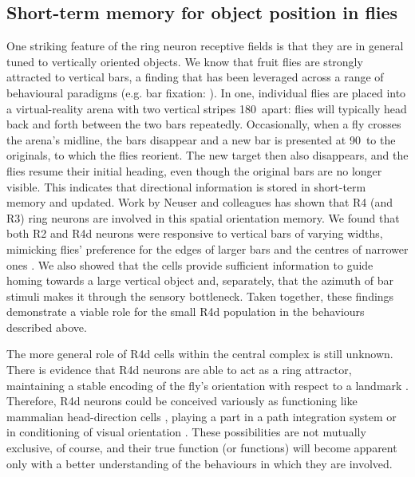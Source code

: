 \subsection*{Short-term memory for object position in flies}
One striking feature of the ring neuron receptive fields is that they are in general tuned to vertically oriented objects. We know that fruit flies are strongly attracted to vertical bars, a finding that has been leveraged across a range of behavioural paradigms (e.g. bar fixation: \cite{Neuser2008}). In one, individual flies are placed into a virtual-reality arena with two vertical stripes 180\degree\ apart: flies will typically head back and forth between the two bars repeatedly. Occasionally, when a fly crosses the arena’s midline, the bars disappear and a new bar is presented at 90\degree\ to the originals, to which the flies reorient. The new target then also disappears, and the flies resume their initial heading, even though the original bars are no longer visible. This indicates that directional information is stored in short-term memory and updated. Work by Neuser and colleagues \cite{Neuser2008} has shown that R4 (and R3) ring neurons are involved in this spatial orientation memory. We found that both R2 and R4d neurons were responsive to vertical bars of varying widths, mimicking flies' preference for the edges of larger bars and the centres of narrower ones \cite{Osorio1990}. We also showed that the cells provide sufficient information to guide homing towards a large vertical object and, separately, that the azimuth of bar stimuli makes it through the sensory bottleneck. Taken together, these findings demonstrate a viable role for the small R4d population in the behaviours described above.

The more general role of R4d cells within the central complex is still unknown.
There is evidence that R4d neurons are able to act as a ring attractor, maintaining a stable encoding of the fly's orientation with respect to a landmark \cite{Seelig2015,Cope2017}.
Therefore, R4d neurons could be conceived variously as functioning like mammalian head-direction cells \cite{Tomchik2008}, playing a part in a path integration system \cite{Neuser2008} or in conditioning of visual orientation \cite{Guo2015}.
These possibilities are not mutually exclusive, of course, and their true function (or functions) will become apparent only with a better understanding of the behaviours in which they are involved.

